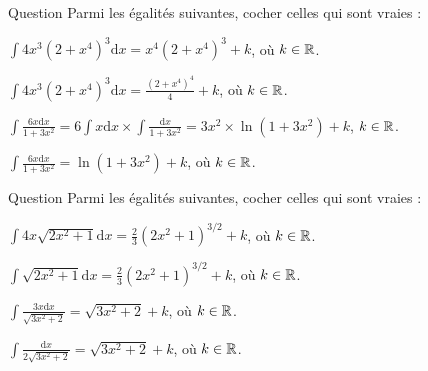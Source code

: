 \begin{multi}[multiple,feedback=
{Avec \(u=2+x^4\), on a : \(\mathrm{d}u=4x^3\mathrm{d}x\) et
\[\int 4x^3(2+x^4)^3\mathrm{d}x=\int u^3\mathrm{d}u=\frac{u^4}{4}+k=\frac{(2+x^4)^4}{4}+k,\; k\in \Rr.\]
De m\^eme, avec \(u=1+3x^2\), on a : \(\mathrm{d}u=6x\mathrm{d}x\) et
\[\int \frac{6x\mathrm{d}x}{1+3x^2}=\int \frac{\mathrm{d}u}{u}=\ln (u)+k=\ln(1+3x^2)+k,\; k\in \Rr.\]
}]{Question}
Parmi les égalités suivantes, cocher celles qui sont vraies :

    \item \(\displaystyle \int 4x^3(2+x^4)^3\mathrm{d}x=x^4(2+x^4)^3+k\), où \(k\in \mathbb{R}\).
    \item* \(\displaystyle \int 4x^3(2+x^4)^3\mathrm{d}x=\frac{(2+x^4)^4}{4}+k\), où \(k\in \mathbb{R}\).
    \item \(\displaystyle \int \frac{6x\mathrm{d}x}{1+3x^2}=6\int x\mathrm{d}x\times\int \frac{\mathrm{d}x}{1+3x^2}=3x^2\times\ln (1+3x^2)+k\), \(k\in \mathbb{R}\).
    \item* \(\displaystyle \int \frac{6x\mathrm{d}x}{1+3x^2}=\ln(1+3x^2)+k\), où \(k\in \mathbb{R}\).
\end{multi}


\begin{multi}[multiple,feedback=
{Avec \(u=2x^2+1\), on a : \(\mathrm{d}u=4x\mathrm{d}x\) et
\[\int 4x\sqrt{2x^2+1}\mathrm{d}x=\int \sqrt{u}\mathrm{d}u=\frac{2}{3}u^{3/2}+k=\frac{2}{3}(2x^2+1)^{3/2}+k,\; k\in \Rr.\]
De m\^eme, avec \(u=3x^2+2\), on a : \(\mathrm{d}u=6x\mathrm{d}x\) et
\[\int \frac{3x\mathrm{d}x}{\sqrt{3x^2+2}}=\int \frac{\mathrm{d}u}{2\sqrt{u}}=\sqrt{u}+k=\sqrt{3x^2+2}+k,\; k\in \Rr.\]
}]{Question}
Parmi les égalités suivantes, cocher celles qui sont vraies :

    \item* \(\displaystyle \int 4x\sqrt{2x^2+1}\mathrm{d}x=\frac{2}{3}(2x^2+1)^{3/2}+k\), où \(k\in \mathbb{R}\).
    \item \(\displaystyle \int \sqrt{2x^2+1}\mathrm{d}x=\frac{2}{3}(2x^2+1)^{3/2}+k\), où \(k\in \mathbb{R}\).
    \item* \(\displaystyle \int \frac{3x\mathrm{d}x}{\sqrt{3x^2+2}}=\sqrt{3x^2+2}+k\), où \(k\in \mathbb{R}\).
    \item \(\displaystyle \int \frac{\mathrm{d}x}{2\sqrt{3x^2+2}}=\sqrt{3x^2+2}+k\), où \(k\in \mathbb{R}\).
\end{multi}


